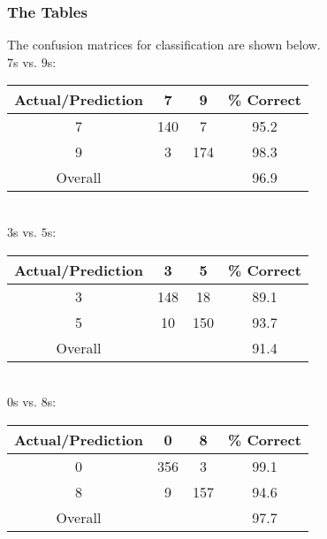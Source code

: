 \documentclass{article}
\begin{document}
\subsubsection{The Tables}
The confusion matrices for classification are shown below.\\
\newline
$7$s vs. $9$s:\\
\newline
\begin{tabular}{| c || c | c || c |}
  \hline
  Actual/Prediction &   7 &   9 &\% Correct \\
  \hline
  \hline
  7                 & 140 &   7 & 95.2 \\
  \hline
  9                 &   3 & 174 & 98.3 \\
  \hline
  \hline
  Overall           &     &     & 96.9 \\
  \hline
\end{tabular}\\
\newline
\newline
$3$s vs. $5$s:\\
\newline
\begin{tabular}{| c || c | c || c |}
  \hline
  Actual/Prediction &   3 &   5 &\% Correct \\
  \hline
  \hline
  3                 & 148 &  18 & 89.1 \\
  \hline
  5                 &  10 & 150 & 93.7 \\
  \hline
  \hline
  Overall           &     &     & 91.4 \\
  \hline
\end{tabular}\\
\newline
\newline
$0$s vs. $8$s:\\
\newline
\begin{tabular}{| c || c | c || c |}
  \hline
  Actual/Prediction &   0 &   8 &\% Correct \\
  \hline
  \hline
  0                 & 356 &   3 & 99.1 \\
  \hline
  8                 &   9 & 157 & 94.6 \\
  \hline
  \hline
  Overall           &     &     & 97.7 \\
  \hline
\end{tabular}\\
\newline
%
\end{document}
